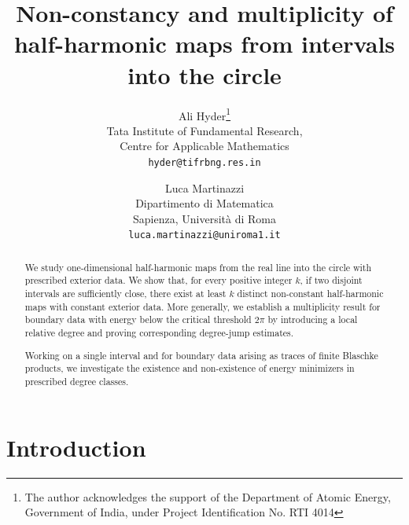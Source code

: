 \documentclass[12pt, a4paper]{article}
\author{Ali Hyder\thanks{The author  acknowledges the support of the Department of Atomic Energy, Government of India, under Project Identification No. RTI 4014} 
\\ {\small Tata Institute of Fundamental Research,}\\{\small  Centre for Applicable Mathematics}\\ {\small \texttt{hyder@tifrbng.res.in}}\and  Luca Martinazzi \\{\small Dipartimento di Matematica}\\  {\small Sapienza, Universit\`a di Roma} \\ {\small \texttt{luca.martinazzi@uniroma1.it}}}
\title{Non-constancy and multiplicity of half-harmonic maps from intervals into the circle}
\renewcommand{\(}{\left(}
\renewcommand{\)}{\right)}
\begin{document}
\maketitle

\begin{abstract}
We study one-dimensional half-harmonic maps from the real line into the circle with prescribed exterior data. We show that, for every positive integer $k$, if two disjoint intervals are sufficiently close, there exist at least $k$ distinct non-constant half-harmonic maps with constant exterior data. More generally, we establish a multiplicity result for boundary data with energy below the critical threshold $2\pi$ by introducing a local relative degree and proving corresponding degree-jump estimates.

Working on a single interval and for boundary data arising as traces of finite Blaschke products, we investigate the existence and non-existence of energy minimizers in prescribed degree classes. %
\end{abstract}

\section{Introduction}
 
\end{document}
